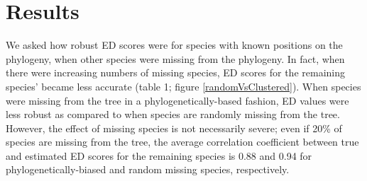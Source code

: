 \documentclass[10pt,english]{article}
\begin{document}


\section*{Results}
We asked how robust ED scores were for species with known positions on the
phylogeny, when other species were missing from the phylogeny. In fact, when
there were increasing numbers of missing species, ED scores for the remaining
species’ became less accurate (table 1; figure \ref{randomVsClustered}). When
species were missing from the tree in a phylogenetically-based fashion, ED
values were less robust as compared to when species are randomly missing from
the tree. However, the effect of missing species is not necessarily severe; even
if 20\% of species are missing from the tree, the average correlation
coefficient between true and estimated ED scores for the remaining species is
0.88 and 0.94 for phylogenetically-biased and random missing species,
respectively.
\end{document}

